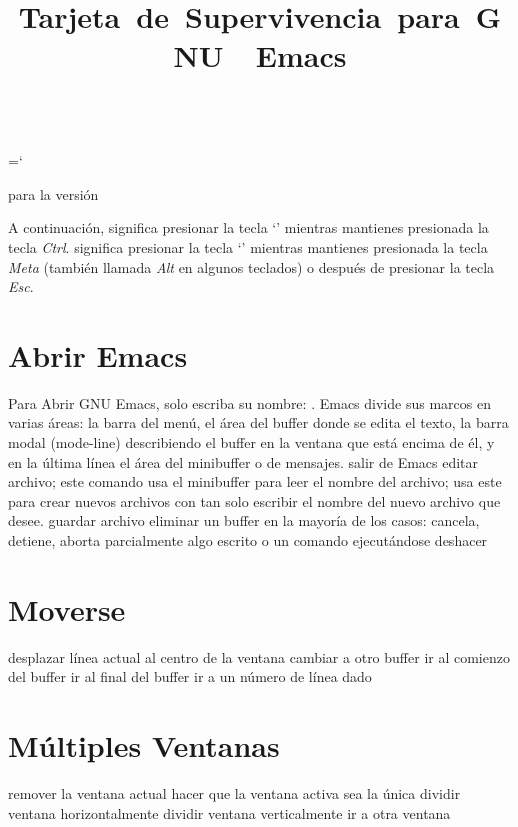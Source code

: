 \chardef\\=`\\

\raggedright
\nopagenumbers
\parindent 0pt
\hoffset -0.2in



\title{Tarjeta\ de\ Supervivencia\ para\ GNU\ \ Emacs}{para la versi{\'o}n \versionemacs}

A continuaci{\'o}n,  significa presionar la tecla `' mientras
mantienes presionada la tecla {\it Ctrl}.  significa
presionar la tecla `' mientras mantienes presionada la tecla
{\it Meta\/} (tambi{\'e}n llamada {\it Alt\/} en algunos teclados)
o despu{\'e}s de presionar la tecla {\it Esc\/}.

\section{Abrir Emacs}

Para Abrir GNU Emacs, solo escriba su nombre: .
Emacs divide sus marcos en varias {\'a}reas:
  la barra del men{\'u},
  el {\'a}rea del buffer donde se edita el texto,
  la barra modal (mode-line) describiendo el buffer en la ventana que est{\'a} encima de {\'e}l,
  y en la {\'u}ltima l{\'i}nea el {\'a}rea del minibuffer o de mensajes.
\askip
{} salir de Emacs
 editar archivo; este comando usa el minibuffer para leer
  el nombre del archivo; usa este para crear nuevos archivos con tan solo
  escribir el nombre del nuevo archivo que desee.
 guardar archivo
 eliminar un buffer
 en la mayor{\'i}a de los casos: cancela, detiene, aborta parcialmente
  algo escrito o un comando ejecut{\'a}ndose
 deshacer

\section{Moverse}

 desplazar l{\'i}nea actual al centro de la ventana
 cambiar a otro buffer
 ir al comienzo del buffer
 ir al final del buffer
 ir a un n{\'u}mero de l{\'i}nea dado

\section{M{\'u}ltiples Ventanas}

 remover la ventana actual
 hacer que la ventana activa sea la {\'u}nica
 dividir ventana horizontalmente
 dividir ventana verticalmente
 ir a otra ventana

